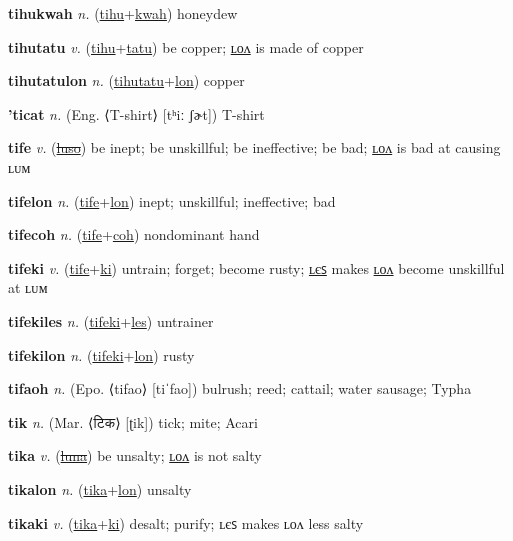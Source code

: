 \textbf{\hypertarget{tihukwah}{tihukwah}} \textit{n.} (\hyperlink{tihu}{tihu}+\allowbreak \hyperlink{kwah}{kwah})
honeydew

\textbf{\hypertarget{tihutatu}{tihutatu}} \textit{v.} (\hyperlink{tihu}{tihu}+\allowbreak \hyperlink{tatu}{tatu})
be copper; \hyperlink{tihutatulon}{ʟᴏᴧ} is made of copper

\textbf{\hypertarget{tihutatulon}{tihutatulon}} \textit{n.} (\hyperlink{tihutatu}{tihutatu}+\allowbreak \hyperlink{lon}{lon})
copper

\textbf{\hypertarget{'ticat}{'ticat}} \textit{n.} (Eng. ⟨T-shirt⟩ [tʰiː ʃɚt])
T-shirt

\textbf{\hypertarget{tife}{tife}} \textit{v.} (\hyperlink{luso}{\sout{luso}})
be inept; be unskillful; be ineffective; be bad; \hyperlink{tifelon}{ʟᴏᴧ} is bad at causing ʟᴜᴍ

\textbf{\hypertarget{tifelon}{tifelon}} \textit{n.} (\hyperlink{tife}{tife}+\allowbreak \hyperlink{lon}{lon})
inept; unskillful; ineffective; bad

\textbf{\hypertarget{tifecoh}{tifecoh}} \textit{n.} (\hyperlink{tife}{tife}+\allowbreak \hyperlink{coh}{coh})
nondominant hand

\textbf{\hypertarget{tifeki}{tifeki}} \textit{v.} (\hyperlink{tife}{tife}+\allowbreak \hyperlink{ki}{ki})
untrain; forget; become rusty; \hyperlink{tifekiles}{ʟєꜱ} makes \hyperlink{tifekilon}{ʟᴏᴧ} become unskillful at ʟᴜᴍ

\textbf{\hypertarget{tifekiles}{tifekiles}} \textit{n.} (\hyperlink{tifeki}{tifeki}+\allowbreak \hyperlink{les}{les})
untrainer

\textbf{\hypertarget{tifekilon}{tifekilon}} \textit{n.} (\hyperlink{tifeki}{tifeki}+\allowbreak \hyperlink{lon}{lon})
rusty

\textbf{\hypertarget{tifaoh}{tifaoh}} \textit{n.} (Epo. ⟨tifao⟩ [tiˈfao])
bulrush; reed; cattail; water sausage; Typha

\textbf{\hypertarget{tik}{tik}} \textit{n.} (Mar. ⟨{\devanagari{}टिक}⟩ [ʈik])
tick; mite; Acari

\textbf{\hypertarget{tika}{tika}} \textit{v.} (\hyperlink{luna}{\sout{luna}})
be unsalty; \hyperlink{tikalon}{ʟᴏᴧ} is not salty

\textbf{\hypertarget{tikalon}{tikalon}} \textit{n.} (\hyperlink{tika}{tika}+\allowbreak \hyperlink{lon}{lon})
unsalty

\textbf{\hypertarget{tikaki}{tikaki}} \textit{v.} (\hyperlink{tika}{tika}+\allowbreak \hyperlink{ki}{ki})
desalt; purify; ʟєꜱ makes ʟᴏᴧ less salty

